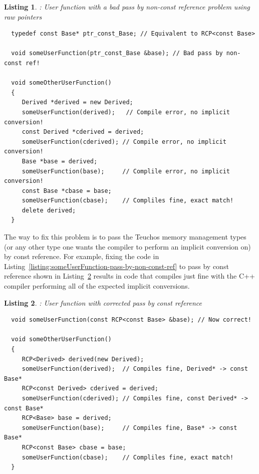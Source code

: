 \documentclass[pdf,ps2pdf,11pt]{SANDreport}
\newtheorem{listing}{Listing}
\begin{document}
{}\begin{listing}: User function with a bad pass by non-const
reference problem using raw pointers
\label{listing:someUserFunction-pass-by-non-const-ref-raw-ptr}
{\small\begin{verbatim}
  typedef const Base* ptr_const_Base; // Equivalent to RCP<const Base>

  void someUserFunction(ptr_const_Base &base); // Bad pass by non-const ref!

  void someOtherUserFunction()
  {
     Derived *derived = new Derived;
     someUserFunction(derived);   // Compile error, no implicit conversion!
     const Derived *cderived = derived;
     someUserFunction(cderived); // Compile error, no implicit conversion!
     Base *base = derived;
     someUserFunction(base);     // Complile error, no implicit conversion!
     const Base *cbase = base;
     someUserFunction(cbase);    // Compliles fine, exact match!
     delete derived;
  }
\end{verbatim}}
\end{listing}


The way to fix this problem is to pass the Teuchos memory management
types (or any other type one wants the compiler to perform an implicit
conversion on) by const reference.  For example, fixing the code in
Listing~\ref{listing:someUserFunction-pass-by-non-const-ref} to pass
by const reference shown in Listing~\ref{listing:someUserFunction-pass-by-const-ref} results in code
that compiles just fine with the C++ compiler performing all of the
expected implicit conversions.


{}\begin{listing}: User function with corrected pass by const
reference
\label{listing:someUserFunction-pass-by-const-ref}
{\small\begin{verbatim}
  void someUserFunction(const RCP<const Base> &base); // Now correct!

  void someOtherUserFunction()
  {
     RCP<Derived> derived(new Derived);
     someUserFunction(derived);  // Compiles fine, Derived* -> const Base*
     RCP<const Derived> cderived = derived;
     someUserFunction(cderived); // Compiles fine, const Derived* -> const Base*
     RCP<Base> base = derived;
     someUserFunction(base);     // Compiles fine, Base* -> const Base*
     RCP<const Base> cbase = base;
     someUserFunction(cbase);    // Compliles fine, exact match!
  }
\end{verbatim}}
\end{listing}
\end{document}
